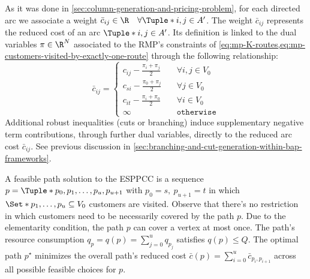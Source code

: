 As it was done in \cref{sec:column-generation-and-pricing-problem},
for each directed arc we associate a weight
$\bar{c}_{ij} \in \R \quad \forall \Tuple*{i, j} \in A^\prime$.
The weight $\bar{c}_{ij}$ represents the reduced cost of an arc $\Tuple*{i, j} \in A^\prime$.
Its definition is linked to the dual variables $\pi \in \R^N$ associated to
the RMP's constraints of \cref{eq:mp-K-routes,eq:mp-customers-visited-by-exactly-one-route}
through the following relationship:
\begin{equation}
	\label{eq:arc-reduced-cost-in-esppcc}
	\bar{c}_{ij} = \begin{cases}
		c_{ij} - \frac{\pi_i + \pi_j}{2} & \quad \forall i, j \in V_0 \\
		c_{si} - \frac{\pi_0 + \pi_j}{2} & \quad \forall j \in V_0    \\
		c_{it} - \frac{\pi_i + \pi_0}{2} & \quad \forall i \in V_0    \\
		\infty                           & \quad \texttt{otherwise}
	\end{cases}
\end{equation}
Additional robust inequalities (cuts or branching) induce
supplementary negative term contributions, through further dual variables,
directly to the reduced arc cost $\bar{c}_{ij}$.
See previous discussion in \cref{sec:branching-and-cut-generation-within-bap-frameworks}.

A feasible path solution to the ESPPCC is a sequence $p = \Tuple*{p_0, p_1, \dots, p_u, p_{u+1}}$
with $p_0 = s, \ p_{u + 1} = t$
in which $\Set*{p_1, \dots, p_u} \subseteq V_0$ customers are visited.
Observe that there's no restriction in which customers need to be necessarily covered
by the path $p$.
Due to the elementarity condition, the path $p$ can cover a vertex at most once.
The path's resource consumption $q_p = q(p) = \sum_{j=0}^{u} q_{p_j}$
satisfies $q(p) \le Q$.
The optimal path $p^\star$ minimizes the overall path's reduced cost
$\bar{c}(p) = \sum_{i=0}^{u} \bar{c}_{p_i,p_{i+1}}$ across all
possible feasible choices for $p$.

\medskip

